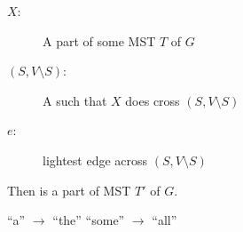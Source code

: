 \begin{frame}{}
  \begin{theorem}
    \begin{description}
      \item[$X:$] A part of some MST $T$ of $G$
      \item[$(S, V \setminus S):$] A  such that $X$ does  cross $(S, V \setminus S)$
    ­  \item[$e:$]  lightest edge across $(S, V \setminus S)$
    \end{description}

    \begin{center}
      {Then  is a part of  MST $T'$ of $G$.}
    \end{center}
  \end{theorem}

  \pause
  \vspace{0.30cm}
  \begin{center}
    {``a'' $\to$ ``the'' \red{$\implies$} ``some'' $\to$ ``all''}
  \end{center}
\end{frame}

%
%
%
